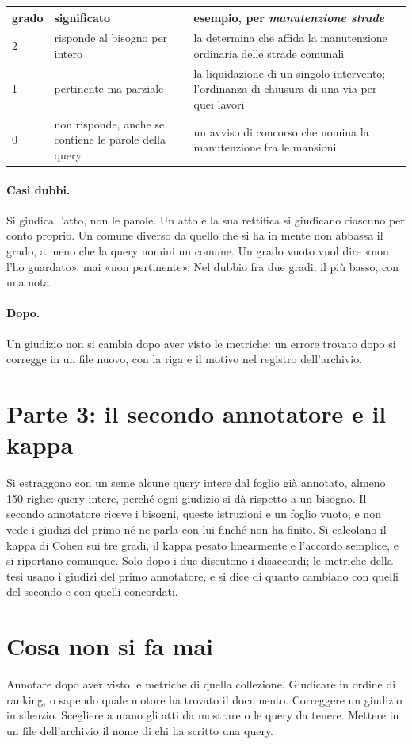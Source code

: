 \begin{center}
\small
\begin{tabular}{p{1.2cm}p{4.4cm}p{5.8cm}}
  \toprule
  grado & significato & esempio, per \emph{manutenzione strade} \\
  \midrule
  2 & risponde al bisogno per intero & la determina che affida la manutenzione
  ordinaria delle strade comunali \\
  1 & pertinente ma parziale & la liquidazione di un singolo intervento;
  l'ordinanza di chiusura di una via per quei lavori \\
  0 & non risponde, anche se contiene le parole della query & un avviso di
  concorso che nomina la manutenzione fra le mansioni \\
  \bottomrule
\end{tabular}
\end{center}

\paragraph{Casi dubbi.} Si giudica l'atto, non le parole. Un atto e la sua
rettifica si giudicano ciascuno per conto proprio. Un comune diverso da quello che
si ha in mente non abbassa il grado, a meno che la query nomini un comune. Un
grado vuoto vuol dire «non l'ho guardato», mai «non pertinente». Nel dubbio fra
due gradi, il più basso, con una nota.

\paragraph{Dopo.} Un giudizio non si cambia dopo aver visto le metriche: un errore
trovato dopo si corregge in un file nuovo, con la riga e il motivo nel registro
dell'archivio.

\section*{Parte 3: il secondo annotatore e il kappa}

Si estraggono con un seme alcune query intere dal foglio già annotato, almeno 150
righe: query intere, perché ogni giudizio si dà rispetto a un bisogno. Il secondo
annotatore riceve i bisogni, queste istruzioni e un foglio vuoto, e non vede i
giudizi del primo né ne parla con lui finché non ha finito. Si calcolano il kappa
di Cohen sui tre gradi, il kappa pesato linearmente e l'accordo semplice, e si
riportano comunque. Solo dopo i due discutono i disaccordi; le metriche della tesi
usano i giudizi del primo annotatore, e si dice di quanto cambiano con quelli del
secondo e con quelli concordati.

\section*{Cosa non si fa mai}

Annotare dopo aver visto le metriche di quella collezione. Giudicare in ordine di
ranking, o sapendo quale motore ha trovato il documento. Correggere un giudizio in
silenzio. Scegliere a mano gli atti da mostrare o le query da tenere. Mettere in un
file dell'archivio il nome di chi ha scritto una query.
